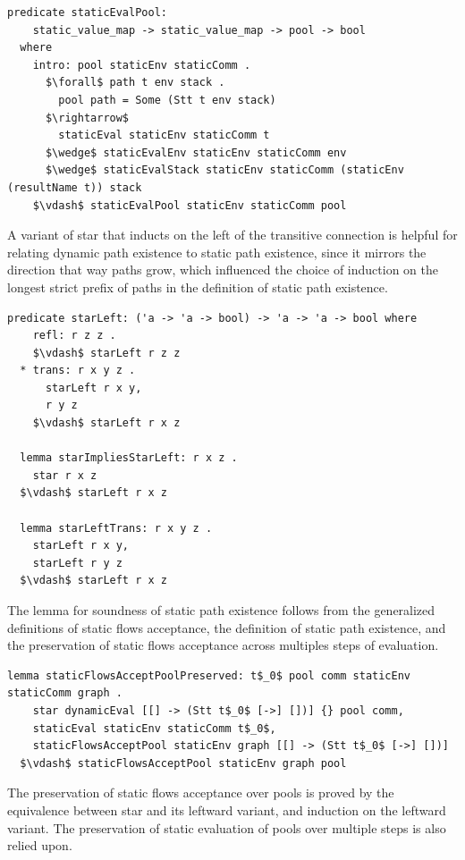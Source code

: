\documentclass[letterpaper, 11pt]{report}
\begin{document}
\begin{lstlisting}[language=logic, mathescape]
  predicate staticEvalPool:
    static_value_map -> static_value_map -> pool -> bool
  where
    intro: pool staticEnv staticComm .
      $\forall$ path t env stack .
        pool path = Some (Stt t env stack)
      $\rightarrow$ 
        staticEval staticEnv staticComm t
      $\wedge$ staticEvalEnv staticEnv staticComm env
      $\wedge$ staticEvalStack staticEnv staticComm (staticEnv (resultName t)) stack
    $\vdash$ staticEvalPool staticEnv staticComm pool
  \end{lstlisting}


A variant of star that inducts on the left of the transitive connection is helpful for
relating dynamic path existence to static path existence, since it mirrors the direction that way
paths grow, which influenced the choice of induction on the longest strict prefix of paths
in the definition of static path existence.

\begin{lstlisting}[language=logic, mathescape]
  predicate starLeft: ('a -> 'a -> bool) -> 'a -> 'a -> bool where
    refl: r z z .
    $\vdash$ starLeft r z z
  * trans: r x y z .
      starLeft r x y,
      r y z
    $\vdash$ starLeft r x z

  lemma starImpliesStarLeft: r x z .
    star r x z
  $\vdash$ starLeft r x z

  lemma starLeftTrans: r x y z .
    starLeft r x y,
    starLeft r y z 
  $\vdash$ starLeft r x z
\end{lstlisting}

The lemma for soundness of static path existence follows from the generalized definitions
of static flows acceptance, the definition of static path existence, and the preservation
of static flows acceptance across multiples steps of evaluation.

\begin{lstlisting}[language=logic, mathescape]
  lemma staticFlowsAcceptPoolPreserved: t$_0$ pool comm staticEnv staticComm graph .
    star dynamicEval [[] -> (Stt t$_0$ [->] [])] {} pool comm, 
    staticEval staticEnv staticComm t$_0$,
    staticFlowsAcceptPool staticEnv graph [[] -> (Stt t$_0$ [->] [])]
  $\vdash$ staticFlowsAcceptPool staticEnv graph pool 
\end{lstlisting}

The preservation of static flows acceptance over pools is proved by the
equivalence between star and its leftward variant, and induction on the leftward variant.
The preservation of static evaluation of pools over multiple steps is also relied upon.
\end{document}
